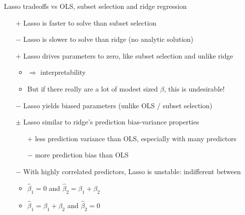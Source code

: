 \documentclass[mathserif, aspectratio=169]{beamer}
\begin{document}
\begin{frame}{Lasso tradeoffs vs OLS, subset selection and ridge regression}

\pause

\begin{enumerate}
\item[$+$] Lasso is faster to solve than subset selection
\item[$-$] Lasso is slower to solve than ridge (no analytic solution)
\item[$+$] Lasso drives parameters to zero, like subset selection and unlike ridge
\begin{itemize}
\item $\Rightarrow$ interpretability
\item But if there really are a lot of modest sized $\beta$, this is undesirable!
\end{itemize}
\item[$-$] Lasso yields biased parameters (unlike OLS / subset selection)
\item[$\pm$] Lasso similar to ridge's prediction bias-variance properties 
\begin{itemize}
\item[$+$] less prediction variance than OLS, especially with many  predictors 
\item[$-$] more prediction bias than OLS
\end{itemize}
\item[$-$] With highly correlated predictors, Lasso is unstable: indifferent between 
\begin{itemize}
\item $\hat{\beta}_1=0$ and $\hat{\beta}_2= \beta_1+\beta_2$
\item $\hat{\beta}_1= \beta_1+\beta_2$ and $\hat{\beta}_2=0$
\end{itemize}
\end{enumerate}

\end{frame}
\end{document}
